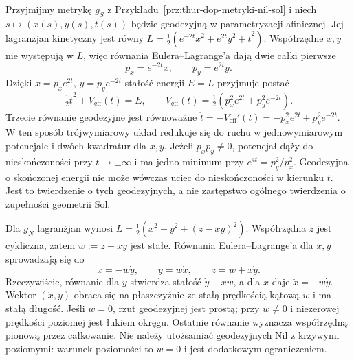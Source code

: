 \begin{przyklad}
\label{prz:thur-dop-geodezyjne-sol}
Przyjmijmy metrykę $g_S$ z Przykładu~\ref{prz:thur-dop-metryki-nil-sol}
i niech $s\mapsto (x(s),y(s),t(s))$ będzie geodezyjną
w parametryzacji afinicznej. Jej lagranżjan kinetyczny jest równy
$L=\tfrac12(e^{-2t}\dot x^2+e^{2t}\dot y^2+\dot t^2)$.
Współrzędne $x,y$ nie występują w $L$, więc równania
Eulera--Lagrange'a dają dwie całki pierwsze
\begin{equation}\label{eq:thur-dop-sol-momenty}
 p_x=e^{-2t}\dot x,\qquad p_y=e^{2t}\dot y.
\end{equation}
Dzięki $\dot x=p_xe^{2t}$, $\dot y=p_ye^{-2t}$
stałość energii $E=L$ przyjmuje postać
\begin{equation}\label{eq:thur-dop-sol-energia}
 \tfrac12\dot t^2+V_{\mathrm{eff}}(t)=E,\qquad
 V_{\mathrm{eff}}(t)=\tfrac12(p_x^2e^{2t}+p_y^2e^{-2t}).
\end{equation}
Trzecie równanie geodezyjne jest równoważne
$\ddot t=-V_{\mathrm{eff}}'(t)
=-p_x^2e^{2t}+p_y^2e^{-2t}$.
W ten sposób trójwymiarowy układ redukuje się do ruchu
w jednowymiarowym potencjale i dwóch kwadratur dla $x,y$.
Jeżeli $p_xp_y\ne0$, potencjał dąży do nieskończoności
przy $t\to\pm\infty$ i ma jedno minimum przy
$e^{4t}=p_y^2/p_x^2$. Geodezyjna o skończonej energii
nie może wówczas uciec do nieskończoności w kierunku $t$.
Jest to twierdzenie o tych geodezyjnych, a nie zastępstwo
ogólnego twierdzenia o zupełności geometrii Sol.
\end{przyklad}

\begin{przyklad}
\label{prz:thur-dop-geodezyjne-nil}
Dla $g_N$ lagranżjan wynosi
$L=\tfrac12(\dot x^2+\dot y^2+(\dot z-x\dot y)^2)$.
Współrzędna $z$ jest cykliczna, zatem
$w:=\dot z-x\dot y$ jest stałe. Równania
Eulera--Lagrange'a dla $x,y$ sprowadzają się do
\begin{equation}\label{eq:thur-dop-nil-geodezyjne}
 \ddot x=-w\dot y,\qquad \ddot y=w\dot x,
 \qquad \dot z=w+x\dot y.
\end{equation}
Rzeczywiście, równanie dla $y$ stwierdza stałość
$\dot y-xw$, a dla $x$ daje $\ddot x=-w\dot y$.
Wektor $(\dot x,\dot y)$ obraca się na płaszczyźnie
ze stałą prędkością kątową $w$ i ma stałą długość.
Jeśli $w=0$, rzut geodezyjnej jest prostą;
przy $w\ne0$ i niezerowej prędkości poziomej jest łukiem okręgu.
Ostatnie równanie wyznacza współrzędną pionową przez całkowanie.
Nie należy utożsamiać geodezyjnych Nil z krzywymi poziomymi:
warunek poziomości to $w=0$ i jest dodatkowym ograniczeniem.
\end{przyklad}
